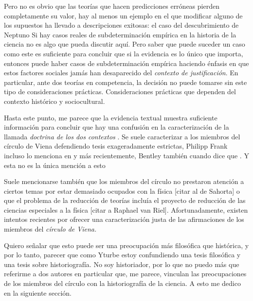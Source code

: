 Pero no es obvio que las teorías que hacen predicciones erróneas pierden completamente su valor, hay al menos un ejemplo en el que modificar alguno de los supuestos ha llevado a descripciones exitosas: el caso del descubrimiento de Neptuno  
Si hay casos reales de subdeterminación empírica en la historia de la ciencia no es algo que pueda discutir aquí.
Pero saber que puede suceder un caso como este es suficiente para concluir que si la evidencia es lo único que importa, entonces puede haber casos de subdeterminación empírica haciendo énfasis en que estos factores sociales jamás han desaparecido del \emph{contexto de justificación}.
En particular, ante dos teorías en competencia, la decisión no puede tomarse sin este tipo de consideraciones prácticas.
Consideraciones prácticas que dependen del contexto histórico y sociocultural.


Hasta este punto, me parece que la evidencia textual muestra suficiente información para concluir que hay una confusión en la caracterización de la llamada \emph{doctrina de los dos contextos} \parencite{Yturbe1995}.
Se suele caracterizar a los miembros del círculo de Viena defendiendo tesis exageradamente estrictas, Philipp Frank incluso lo menciona en  y más recientemente, Bentley también cuando dice que .
Y esta no es la única mención a esto 


Suele mencionarse también que los miembros del círculo no prestaron atención a ciertos temas por estar demasiado ocupados con la física [citar al de Sahorta] o que el problema de la reducción de teorías incluía el proyecto de reducción de las ciencias especiales a la física [citar a Raphael van Riel].
Afortunadamente, existen intentos recientes por ofrecer una caracterización justa de las afirmaciones de los miembros del \emph{círculo de Viena.}

Quiero señalar que esto puede ser una preocupación más filosófica que histórica, y por lo tanto, parecer que como Yturbe \cite{Yturbe1995} estoy confundiendo una tesis filosófica y una tesis sobre historiografía.
No soy historiador, por lo que no puedo más que referirme a dos autores en particular que, me parece, vinculan las preocupaciones de los miembros del círculo con la historiografía de la ciencia.
A esto me dedico en la siguiente sección.


